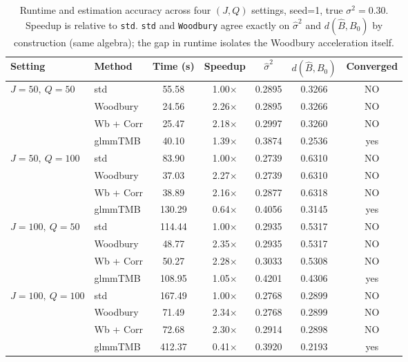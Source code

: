 \begin{table}[ht]
\centering
\begin{tabular}{llccccc}
\toprule
Setting & Method & Time (s) & Speedup & $\hat\sigma^2$ & $d(\hat B, B_0)$ & Converged \\
\midrule
\multirow{4}{*}{$J=50,\ Q=50$}
 & std             & 55.58  & 1.00$\times$ & 0.2895 & 0.3266 & NO \\
 & Woodbury   & 24.56  & 2.26$\times$ & 0.2895 & 0.3266 & NO \\
 & Wb + Corr       & 25.47  & 2.18$\times$ & 0.2997 & 0.3260 & NO \\
 & glmmTMB    & 40.10  & 1.39$\times$ & 0.3874 & 0.2536 & yes \\
\midrule
\multirow{4}{*}{$J=50,\ Q=100$}
 & std             & 83.90  & 1.00$\times$ & 0.2739 & 0.6310 & NO \\
 & Woodbury   & 37.03  & 2.27$\times$ & 0.2739 & 0.6310 & NO \\
 & Wb + Corr       & 38.89  & 2.16$\times$ & 0.2877 & 0.6318 & NO \\
 & glmmTMB    & 130.29 & 0.64$\times$ & 0.4056 & 0.3145 & yes \\
\midrule
\multirow{4}{*}{$J=100,\ Q=50$}
 & std        & 114.44 & 1.00$\times$ & 0.2935 & 0.5317 & NO \\
 & Woodbury   & 48.77  & 2.35$\times$ & 0.2935 & 0.5317 & NO \\
 & Wb + Corr  & 50.27  & 2.28$\times$ & 0.3033 & 0.5308 & NO \\
 & glmmTMB    & 108.95 & 1.05$\times$ & 0.4201 & 0.4306 & yes \\
\midrule
\multirow{4}{*}{$J=100,\ Q=100$}
 & std        & 167.49 & 1.00$\times$ & 0.2768 & 0.2899 & NO \\
 & Woodbury   & 71.49  & 2.34$\times$ & 0.2768 & 0.2899 & NO \\
 & Wb + Corr  & 72.68  & 2.30$\times$ & 0.2914 & 0.2898 & NO \\
 & glmmTMB    & 412.37 & 0.41$\times$ & 0.3920 & 0.2193 & yes \\
\bottomrule
\end{tabular}
\caption{Runtime and estimation accuracy across four $(J,Q)$ settings, seed=1, true $\sigma^2=0.30$. Speedup is relative to \texttt{std}. \texttt{std} and \texttt{Woodbury} agree exactly on $\hat\sigma^2$ and $d(\hat B, B_0)$ by construction (same algebra); the gap in runtime isolates the Woodbury acceleration itself.}
\label{tab:speed-accuracy}
\end{table}

